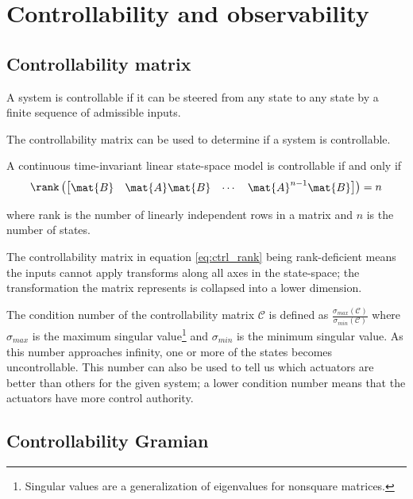 \section{Controllability and observability}

\subsection{Controllability matrix}

A \gls{system} is controllable if it can be steered from any \gls{state} to any
\gls{state} by a finite sequence of admissible \glspl{input}.

The controllability matrix can be used to determine if a system is controllable.
\begin{theorem}[Controllability]
  A continuous \gls{time-invariant} linear state-space \gls{model} is
  controllable if and only if
  \begin{equation}
    \rank\left(
    \begin{bmatrix}
      \mat{B} & \mat{A}\mat{B} & \cdots & \mat{A}^{n-1}\mat{B}
    \end{bmatrix}
    \right) = n
    \label{eq:ctrl_rank}
  \end{equation}

  where rank is the number of linearly independent rows in a matrix and $n$ is
  the number of \glspl{state}.
\end{theorem}

The controllability matrix in equation \eqref{eq:ctrl_rank} being rank-deficient
means the \glspl{input} cannot apply transforms along all axes in the
state-space; the transformation the matrix represents is collapsed into a lower
dimension.

The condition number of the controllability matrix $\mathcal{C}$ is defined as
$\frac{\sigma_{max}(\mathcal{C})}{\sigma_{min}(\mathcal{C})}$ where
$\sigma_{max}$ is the maximum singular
value\footnote{\label{footn:singular_val}Singular values are a generalization of
eigenvalues for nonsquare matrices.} and $\sigma_{min}$ is the minimum singular
value. As this number approaches infinity, one or more of the \glspl{state}
becomes uncontrollable. This number can also be used to tell us which actuators
are better than others for the given \gls{system}; a lower condition number
means that the actuators have more control authority.

\subsection{Controllability Gramian}


